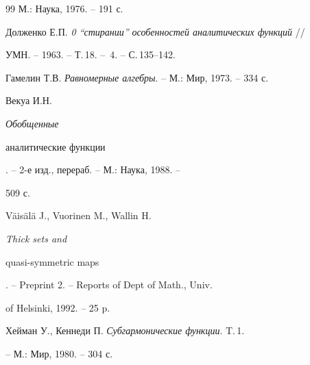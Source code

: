 \begin{thebibliography}{99}
М.: Наука, 1976. -- 191 с. 




Долженко Е.П. {\em 0 ``стирании'' особенностей аналитических функций} // 


УМН. -- 1963. -- Т.\,18. -- \No\,4. -- С.\,135--142. 




Гамелин Т.В. {\em Равномерные алгебры}. -- М.: Мир, 1973. -- 334 с. 




Векуа И.Н. {\em Обобщенные 


аналитические функции}. -- 2-е изд., перераб. -- М.: Наука, 1988. -- 


509 с. 




V\"ais\"al\"a J., Vuorinen M., Wallin H. {\em Thick sets and 


quasi-symmetric maps}. -- Preprint 2. -- Reports of Dept of Math., Univ.


of Helsinki, 1992. -- 25 p. 




Хейман У., Кеннеди П. {\em Субгармонические функции}. T.\,1.


-- М.: Мир, 1980. -- 304 с. 


 


\end{thebibliography} 


 


\vskip 2cm 


 








 


\label{end} 


 


